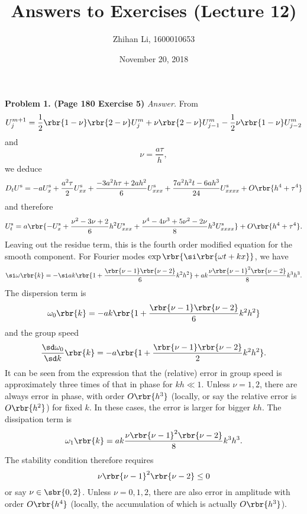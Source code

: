 \documentclass[english, nochinese]{pnote}
\title{Answers to Exercises (Lecture 12)}
\author{Zhihan Li, 1600010653}
\date{November 20, 2018}
\begin{document}
\maketitle

\textbf{Problem 1. (Page 180 Exercise 5)} \textit{Answer.} From
\begin{equation}
U_j^{ m + 1 } = \frac{1}{2} \rbr{ 1 - \nu } \rbr{ 2 - \nu } U_j^m + \nu \rbr{ 2 - \nu } U_{ j - 1 }^m - \frac{1}{2} \nu \rbr{ 1 - \nu } U_{ j - 2 }^m
\end{equation}
and
\begin{equation}
\nu = \frac{ a \tau }{h},
\end{equation}
we deduce
\begin{equation}
D_t U^{\text{s}} =  -a U^{\text{s}}_x + \frac{ a^2 \tau }{2} U^{\text{s}}_{ x x } + \frac{ -3 a^2 h \tau + 2 a h^2 }{6} U^{\text{s}}_{ x x x } + \frac{ 7 a^2 h^2 t - 6 a h^3 }{24} U^{\text{s}}_{ x x x x } + O \rbr{ h^4 + \tau^4 }
\end{equation}
and therefore
\begin{equation}
U^{\text{s}}_t = a \rbr{ -U^{\text{s}}_x + \frac{ \nu^2 - 3 \nu + 2 }{6} h^2 U^{\text{s}}_{ x x x } + \frac{ \nu^4 - 4 \nu^3 + 5 \nu^2 - 2 \nu }{8} h^3 U^{\text{s}}_{ x x x x } } + O \rbr{ h^4 + \tau^4 }.
\end{equation}
Leaving out the residue term, this is the fourth order modified equation for the smooth component. For Fourier modes $ \exp \rbr{ \si \rbr{ \omega t + k x } } $, we have
\begin{equation}
\si \omega \rbr{k} = -\si a k \rbr{ 1 + \frac{ \rbr{ \nu - 1 } \rbr{ \nu - 2 } }{6} k^2 h^2 } + a k \frac{ \nu \rbr{ \nu - 1 }^2 \rbr{ \nu - 2 } }{8} k^3 h^3.
\end{equation} 
The dispersion term is
\begin{equation}
\omega_0 \rbr{k} = -a k \rbr{ 1 + \frac{ \rbr{ \nu - 1 } \rbr{ \nu - 2 } }{6} k^2 h^2 }
\end{equation}
and the group speed
\begin{equation}
\frac{ \sd \omega_0 }{ \sd k } \rbr{k} = - a \rbr{ 1 + \frac{ \rbr{ \nu - 1 } \rbr{ \nu - 2 } }{2} k^2 h^2 }.
\end{equation}
It can be seen from the expression that the (relative) error in group speed is approximately three times of that in phase for $ k h \ll 1 $. Unless $ \nu = 1, 2 $, there are always error in phase, with order $ O \rbr{h^3} $ (locally, or say the relative error is $ O \rbr{h^2} $) for fixed $k$. In these cases, the error is larger for bigger $ k h $. The dissipation term is
\begin{equation}
\omega_1 \rbr{k} = a k \frac{ \nu \rbr{ \nu - 1 }^2 \rbr{ \nu - 2 } }{8} k^3 h^3.
\end{equation}
The stability condition therefore requires
\begin{equation}
\nu \rbr{ \nu - 1 }^2 \rbr{ \nu - 2 } \le 0
\end{equation}
or say $ \nu \in \sbr{ 0, 2 } $. Unless $ \nu = 0, 1, 2 $, there are also error in amplitude with order $ O \rbr{h^4} $ (locally, the accumulation of which is actually $ O \rbr{h^3} $).
\end{document}
